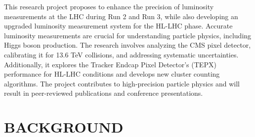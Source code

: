 \documentclass[final,12p]{article}
\begin{document}
  \vspace{0.5cm}
   
This research project proposes to enhance the precision of luminosity measurements at the LHC during Run 2 and Run 3, while also developing an upgraded luminosity measurement system for the HL-LHC phase. Accurate luminosity measurements are crucial for understanding particle physics, including Higgs boson production. The research involves analyzing the CMS pixel detector, calibrating it for 13.6 TeV collisions, and addressing systematic uncertainties. Additionally, it explores the Tracker Endcap
Pixel Detector's (TEPX) performance for HL-LHC conditions and develops new cluster counting algorithms. The project contributes to high-precision particle physics and will result in peer-reviewed publications and conference presentations.

  \hspace{2pt}
\vfill



\newpage
\section{BACKGROUND}
\end{document}
